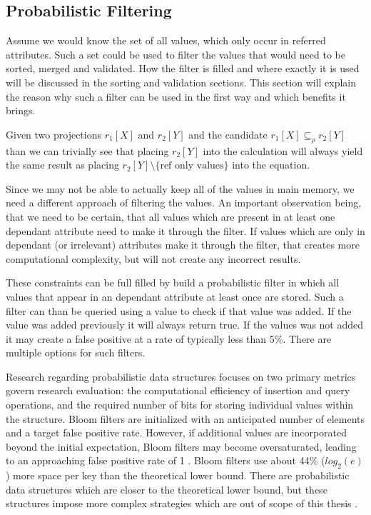 \subsection{Probabilistic Filtering}
Assume we would know the set of all values, which only occur in referred attributes. Such a set could be used to filter the values that would need to be sorted, merged and validated. How the filter is filled and where exactly it is used will be discussed in the sorting and validation sections. This section will explain the reason why such a filter can be used in the first way and which benefits it brings.

Given two projections $r_1[X]$ and $r_2[Y]$ and the candidate $r_1[X] \subseteq_\rho r_2[Y]$ than we can trivially see that placing $r_2[Y]$ into the calculation will always yield the same result as placing $r_2[Y] \setminus \text{\{ref only values\}}$ into the equation.

Since we may not be able to actually keep all of the values in main memory, we need a different approach of filtering the values. An important observation being, that we need to be certain, that all values which are present in at least one dependant attribute need to make it through the filter. If values which are only in dependant (or irrelevant) attributes make it through the filter, that creates more computational complexity, but will not create any incorrect results.

These constraints can be full filled by build a probabilistic filter in which all values that appear in an dependant attribute at least once are stored. Such a filter can than be queried using a value to check if that value was added. If the value was added previously it will always return true. If the values was not added it may create a false positive at a rate of typically less than 5\%. There are multiple options for such filters.

Research regarding probabilistic data structures focuses on two primary metrics govern research evaluation: the computational efficiency of insertion and query operations, and the required number of bits for storing individual values within the structure\cite{fan2014cuckoo}. Bloom filters are initialized with an anticipated number of elements and a target false positive rate. However, if additional values are incorporated beyond the initial expectation, Bloom filters may become oversaturated, leading to an approaching false positive rate of 1 \cite{tarkoma2011theory}. Bloom filters use about 44\% ($log_2(e)$) more space per key than the theoretical lower bound. There are probabilistic data structures which are closer to the theoretical lower bound, but these structures impose more complex strategies which are out of scope of this thesis \cite{fan2014cuckoo}.

